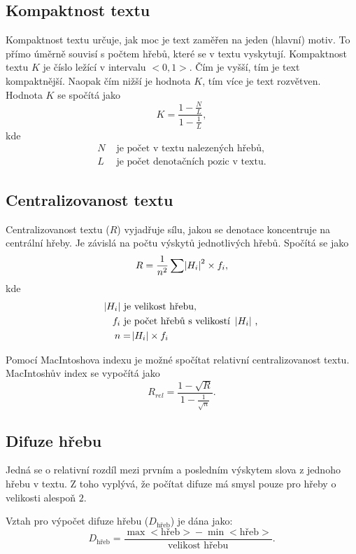 \documentclass[dp.tex]{subfiles}
\begin{document}
\subsection{Kompaktnost textu}
Kompaktnost textu určuje, jak moc je text zaměřen na jeden (hlavní) motiv. To přímo úměrně souvisí s počtem hřebů, které se v textu vyskytují. Kompaktnost textu $K$ je číslo ležící v intervalu $<0,1>$. Čím je vyšší, tím je text kompaktnější. Naopak čím nižší je hodnota $K$, tím více je text rozvětven. Hodnota $K$ se spočítá jako
\begin{equation}
K=\frac{1-\frac{N}{L}}{1-\frac{1}{L}},
\end{equation}
kde 
\begin{align*}
      N & \text{ je počet v textu nalezených hřebů,}\\
      L & \text{ je počet denotačních pozic v textu.}
\end{align*}     

\subsection{Centralizovanost textu}
Centralizovanost textu ($R$) vyjadřuje sílu, jakou se denotace koncentruje na centrální hřeby. Je závislá na počtu výskytů jednotlivých hřebů. Spočítá se jako
\begin{equation}
R=\frac{1}{n^2}\sum{ \abs{H_i}^2 \times f_i},
\end{equation}
kde 
\begin{align*}
      \abs{H_i} & \text{ je velikost hřebu,}\\
      f_i & \text{ je počet hřebů s velikostí \abs{H_i},}\\
      n&=\abs{H_i}\times f_i
\end{align*}     

Pomocí MacIntoshova indexu je možné spočítat relativní centralizovanost textu. MacIntoshův index se vypočítá jako
\begin{equation}
R_{rel}=\frac{1-\sqrt{R}}{1-\frac{1}{\sqrt{n}}}.
\end{equation}

\subsection{Difuze hřebu}
Jedná se o relativní rozdíl mezi prvním a posledním výskytem slova z jednoho hřebu v textu. Z toho vyplývá, že počítat difuze má smysl pouze pro hřeby o velikosti alespoň $2$.

Vztah pro výpočet difuze hřebu ($D_{\text{hřeb}}$) je dána jako:
\begin{equation}
D_\text{hřeb}=\frac{\max{<\text{hřeb}>}-\min{<\text{hřeb}>}}{\text{velikost hřebu}}.
\end{equation}
\end{document}
